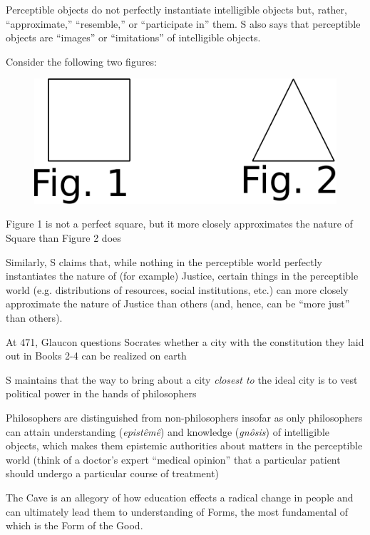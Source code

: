 \documentclass[11pt]{article}
\begin{document}
\noindent Perceptible objects do not perfectly instantiate intelligible objects but, rather, ``approximate,'' ``resemble,'' or ``participate in'' them. S also says that perceptible objects are ``images'' or ``imitations'' of intelligible objects.
\vspace*{2mm}

\noindent Consider the following two figures:

\begin{figure}[h!]
\hspace*{35mm}
\includegraphics[scale=0.6]{figure1}
\end{figure}

\noindent Figure 1 is not a perfect square, but it more closely approximates the nature of Square than Figure 2 does
\vspace*{2mm}

\noindent Similarly, S claims that, while nothing in the perceptible world perfectly instantiates the nature of (for example) Justice, certain things in the perceptible world (e.g. distributions of resources, social institutions, etc.) can more closely approximate the nature of Justice than others (and, hence, can be ``more just'' than others).

\noindent At 471, Glaucon questions Socrates whether a city with the constitution they laid out in Books 2-4 can be realized on earth
\vspace*{2mm}

\noindent S maintains that the way to bring about a city \emph{closest to} the ideal city is to vest political power in the hands of philosophers
\vspace*{2mm}

\noindent Philosophers are distinguished from non-philosophers insofar as only philosophers can attain understanding (\emph{epist\^{e}m\^{e}}) and knowledge (\emph{gn\^{o}sis}) of intelligible objects, which makes them epistemic authorities about matters in the perceptible world (think of a doctor's expert ``medical opinion'' that a particular patient should undergo a particular course of treatment)
\vspace*{2mm}

\noindent The Cave is an allegory of how education effects a radical change in people and can ultimately lead them to understanding of Forms, the most fundamental of which is the Form of the Good.
\end{document}
